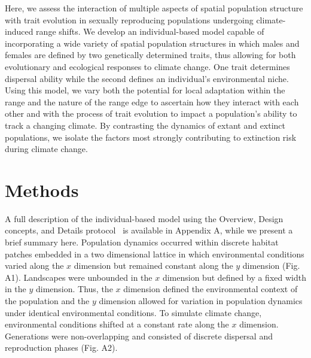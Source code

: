 \documentclass[12pt, oneside]{article}
\begin{document}
Here, we assess the interaction of multiple aspects of spatial population structure with trait evolution in sexually reproducing populations undergoing climate-induced range shifts. We develop an individual-based model capable of incorporating a wide variety of spatial population structures in which males and females are defined by two genetically determined traits, thus allowing for both evolutionary and ecological responses to climate change. One trait determines dispersal ability while the second defines an individual's environmental niche. Using this model, we vary both the potential for local adaptation within the range and the nature of the range edge to ascertain how they interact with each other and with the process of trait evolution to impact a population's ability to track a changing climate. By contrasting the dynamics of extant and extinct populations, we isolate the factors most strongly contributing to extinction risk during climate change.

\section*{Methods}
A full description of the individual-based model using the Overview, Design concepts, and Details protocol~\citep{grimm2010odd} is available in Appendix A, while we present a brief summary here. Population dynamics occurred within discrete habitat patches embedded in a two dimensional lattice in which environmental conditions varied along the $x$ dimension but remained constant along the $y$ dimension (Fig. A1). Landscapes were unbounded in the $x$ dimension but defined by a fixed width in the $y$ dimension. Thus, the $x$ dimension defined the environmental context of the population and the $y$ dimension allowed for variation in population dynamics under identical environmental conditions. To simulate climate change, environmental conditions shifted at a constant rate along the $x$ dimension. Generations were non-overlapping and consisted of discrete dispersal and reproduction phases (Fig. A2).
\end{document}
